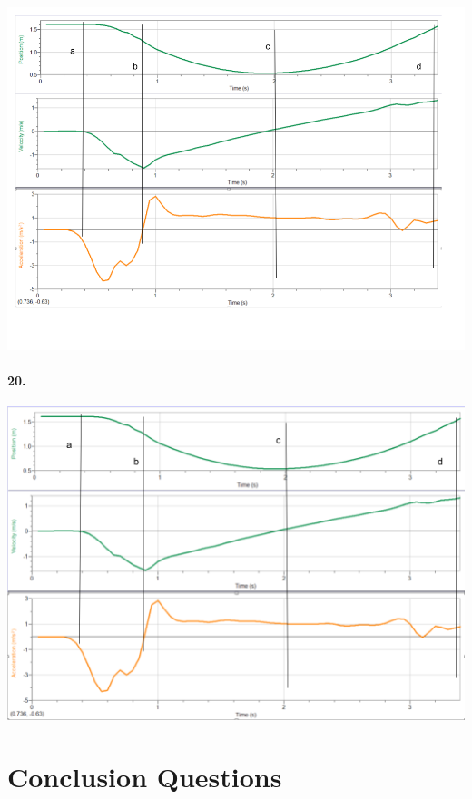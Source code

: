     \begin{mdframed}
        {\centering\includegraphics[width=\textwidth]{image21}}
    \end{mdframed}

    \pagebreak

    \paragraph*{20.}
    
    \begin{mdframed}
        {\centering\includegraphics[width=\textwidth]{image9}}
    \end{mdframed}

    \section*{Conclusion Questions}


